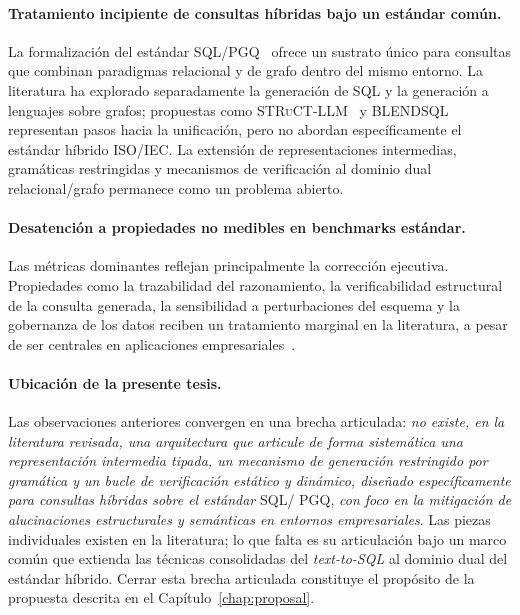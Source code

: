 \paragraph{Tratamiento incipiente de consultas híbridas bajo un estándar
común.} La formalización del estándar \ac{SQL}/\ac{PGQ}~%
\cite{ISO9075_16_2023} ofrece un sustrato único para consultas que combinan
paradigmas relacional y de grafo dentro del mismo entorno. La literatura
ha explorado separadamente la generación de \ac{SQL} y la generación a
lenguajes sobre grafos; propuestas como \textsc{STRuCT-LLM}~%
\cite{STRuCT-LLM2026} y \textsc{BLENDSQL}~\cite{BLENDSQL2025} representan
pasos hacia la unificación, pero no abordan específicamente el estándar
híbrido ISO/IEC. La extensión de representaciones intermedias, gramáticas
restringidas y mecanismos de verificación al dominio dual relacional/grafo
permanece como un problema abierto.

\paragraph{Desatención a propiedades no medibles en benchmarks
estándar.} Las métricas dominantes reflejan principalmente la corrección
ejecutiva. Propiedades como la trazabilidad del razonamiento, la
verificabilidad estructural de la consulta generada, la sensibilidad a
perturbaciones del esquema y la gobernanza de los datos reciben un
tratamiento marginal en la literatura, a pesar de ser centrales en
aplicaciones empresariales~\cite{Data2Decisions, NLinterfaces, SAFENLIDB}.

\paragraph{Ubicación de la presente tesis.} Las observaciones anteriores
convergen en una brecha articulada: \emph{no existe, en la literatura
revisada, una arquitectura que articule de forma sistemática una
representación intermedia tipada, un mecanismo de generación restringido
por gramática y un bucle de verificación estático y dinámico, diseñado
específicamente para consultas híbridas sobre el estándar} \ac{SQL}/%
\ac{PGQ}, \emph{con foco en la mitigación de alucinaciones estructurales
y semánticas en entornos empresariales}. Las piezas individuales existen
en la literatura; lo que falta es su articulación bajo un marco común que
extienda las técnicas consolidadas del \emph{text-to-SQL} al dominio dual
del estándar híbrido. Cerrar esta brecha articulada constituye el
propósito de la propuesta descrita en el Capítulo~\ref{chap:proposal}.
